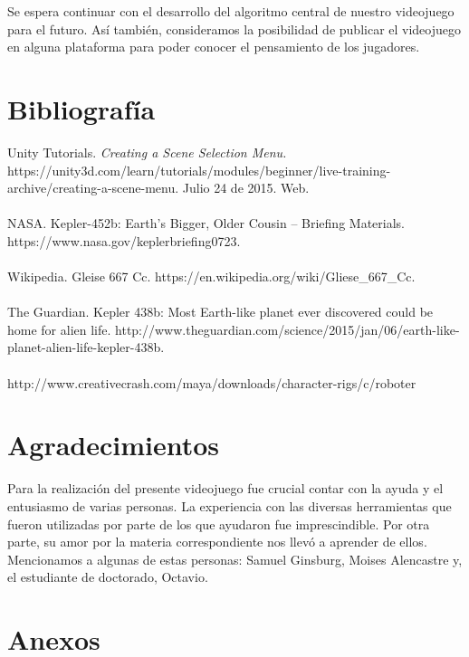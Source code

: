 \documentclass[12pt, conference]{IEEEtran}
\begin{document}
Se espera continuar con el desarrollo del algoritmo central de nuestro videojuego para el futuro. As\'{i} tambi\'{e}n, consideramos la posibilidad de publicar el videojuego en alguna plataforma para poder conocer el pensamiento de los jugadores.

\section{Bibliograf\'{i}a}

\begingroup

    \fontsize{10pt}{12pt}\selectfont
    Unity Tutorials. \emph{Creating a Scene Selection Menu.} https://unity3d.com/learn/tutorials/modules/beginner/live-training-archive/creating-a-scene-menu. Julio 24 de 2015. Web.
    \\ \\
    NASA. Kepler-452b: Earth's Bigger, Older Cousin -- Briefing Materials. https://www.nasa.gov/keplerbriefing0723.
    \\ \\
    Wikipedia. Gleise 667 Cc. https://en.wikipedia.org/wiki/Gliese\_667\_Cc.
    \\ \\
    The Guardian. Kepler 438b: Most Earth-like planet ever discovered could be home for alien life. http://www.theguardian.com/science/2015/jan/06/earth-like-planet-alien-life-kepler-438b.
    \\ \\
    http://www.creativecrash.com/maya/downloads/character-rigs/c/roboter

\endgroup

\section*{Agradecimientos}

Para la realizaci\'{o}n del presente videojuego fue crucial contar con la ayuda y el entusiasmo de varias personas. La experiencia con las diversas herramientas que fueron utilizadas por parte de los que ayudaron fue imprescindible. Por otra parte, su amor por la materia correspondiente nos llev\'{o} a aprender de ellos. Mencionamos a algunas de estas personas: Samuel Ginsburg, Moises Alencastre y, el estudiante de doctorado, Octavio.

\section{Anexos}
\end{document}
